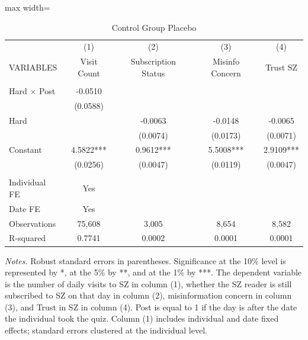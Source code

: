  \begin{table}[H]
 \centering
 \caption{Control Group Placebo}
 \label{tab:C_Placebo}
 \begin{adjustbox}{max width=\textwidth}
\def\sym#1{\ifmmode^{#1}\else\(^{#1}\)\fi}
\begin{tabular}{lcccc}
 \toprule
 & (1) & (2) & (3) & (4) \\
VARIABLES & Visit Count & Subscription Status & Misinfo Concern & Trust SZ \\
 \hline
 & & & & \\
Hard $\times$ Post&  -0.0510   &            &            &            \\
                & (0.0588)   &            &            &            \\
Hard            &            &  -0.0063   &  -0.0148   &  -0.0065   \\
                &            & (0.0074)   & (0.0173)   & (0.0071)   \\
Constant        &   4.5822***&   0.9612***&   5.5008***&   2.9109***\\
                & (0.0256)   & (0.0047)   & (0.0119)   & (0.0047)   \\
 & & & & \\
Individual FE & Yes & & & \\
Date FE & Yes & & & \\
\midrule
Observations &   75,608 &    3,005 &    8,654 &    8,582 \\
R-squared &   0.7741 &   0.0002 &   0.0001 &   0.0001 \\
 \midrule
 \bottomrule
\end{tabular}
 \end{adjustbox}
 \par
 \begin{minipage}{0.98\linewidth}
 \baselineskip9pt {\scriptsize \vspace{0.1cm} { \it Notes.} Robust standard errors in parentheses. Significance at the 10\% level is represented by *, at the 5\% by **, and at the 1\% by ***. The dependent variable is the number of daily visits to SZ in column (1), whether the SZ reader is still subscribed to SZ on that day in column (2), misinformation concern in column (3), and Trust in SZ in column (4). Post is equal to 1 if the day is after the date the individual took the quiz. Column (1) includes individual and date fixed effects; standard errors clustered at the individual level.}
 \end{minipage}
 \end{table}
